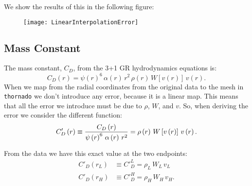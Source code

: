 We show the results of this in the following figure:
\begin{figure}[H]
\centering
\texttt{[image: LinearInterpolationError]}
\end{figure}

\subsection{Mass Constant}
The mass constant, $C_{D}$, from the 3+1 GR hydrodynamics equations is:
\begin{equation}
    C_{D}\left(r\right)=\psi\left(r\right)^{6}\,\alpha\left(r\right)\,r^{2}\,\rho\left(r\right)\,W\left[v\left(r\right)\right]\,v\left(r\right).
\end{equation}
When we map from the radial coordinates from the original data to the mesh in \texttt{thornado} we don't introduce any error, because it is a linear map. This means that all the error we introduce must be due to $\rho$, $W$, and $v$. So, when deriving the error we consider the different function:
\begin{equation}
    C'_{D}\left(r\right)\equiv\frac{C_{D}\left(r\right)}{\psi\left(r\right)^{6}\,\alpha\left(r\right)\,r^{2}}=\rho\left(r\right)\,W\left[v\left(r\right)\right]\,v\left(r\right).
\end{equation}

From the data we have this exact value at the two endpoints:
\begin{align}
    C'_{D}\left(r_{L}\right)&\equiv C'^{L}_{D}=\rho_{L}\,W_{L}\,v_{L}\\
    C'_{D}\left(r_{H}\right)&\equiv C'^{H}_{D}=\rho_{H}\,W_{H}\,v_{H}.
\end{align}
